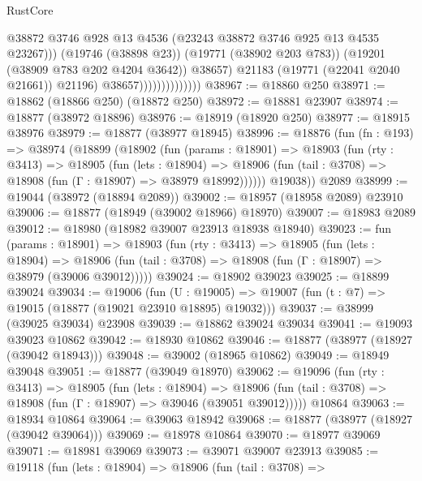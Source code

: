 \begin{lexlean}{RustCore}
\begin{coremodule}
                                        @38872
                                        @3746
                                        @928
                                        @13
                                        @4536
                                        (@23243 @38872 @3746 @925 @13 @4535 @23267)))
                                    (@19746 (@38898 @23))
                                    (@19771 (@38902 @203 @783))
                                    (@19201 (@38909 @783 @202 @4204 @3642))
                                    @38657)
                                  @21183
                                  (@19771 (@22041 @2040 @21661))
                                  @21196)
                                @38657))))))))))))))
@38967 := @18860 @250
@38971 := @18862 (@18866 @250) (@18872 @250)
@38972 := @18881 @23907
@38974 := @18877 (@38972 @18896)
@38976 := @18919 (@18920 @250)
@38977 := @18915 @38976
@38979 := @18877 (@38977 @18945)
@38996 := @18876
    (fun (fn : @193) =>
    @38974
      (@18899
        (@18902
          (fun (params : @18901) =>
          @18903
            (fun (rty : @3413) =>
            @18905
              (fun (lets : @18904) =>
              @18906 (fun (tail : @3708) => @18908 (fun (Γ : @18907) => @38979 @18992))))))
        @19038))
    @2089
@38999 := @19044 (@38972 (@18894 @2089))
@39002 := @18957 (@18958 @2089) @23910
@39006 := @18877 (@18949 (@39002 @18966) @18970)
@39007 := @18983 @2089
@39012 := @18980 (@18982 @39007 @23913 @18938 @18940)
@39023 := fun (params : @18901) =>
  @18903
    (fun (rty : @3413) =>
    @18905
      (fun (lets : @18904) =>
      @18906 (fun (tail : @3708) => @18908 (fun (Γ : @18907) => @38979 (@39006 @39012)))))
@39024 := @18902 @39023
@39025 := @18899 @39024
@39034 := @19006
    (fun (U : @19005) => @19007 (fun (t : @7) => @19015 (@18877 (@19021 @23910 @18895) @19032)))
@39037 := @38999 (@39025 @39034) @23908
@39039 := @18862 @39024 @39034
@39041 := @19093 @39023 @10862
@39042 := @18930 @10862
@39046 := @18877 (@38977 (@18927 (@39042 @18943)))
@39048 := @39002 (@18965 @10862)
@39049 := @18949 @39048
@39051 := @18877 (@39049 @18970)
@39062 := @19096
    (fun (rty : @3413) =>
    @18905
      (fun (lets : @18904) =>
      @18906 (fun (tail : @3708) => @18908 (fun (Γ : @18907) => @39046 (@39051 @39012)))))
    @10864
@39063 := @18934 @10864
@39064 := @39063 @18942
@39068 := @18877 (@38977 (@18927 (@39042 @39064)))
@39069 := @18978 @10864
@39070 := @18977 @39069
@39071 := @18981 @39069
@39073 := @39071 @39007 @23913
@39085 := @19118
    (fun (lets : @18904) =>
    @18906
      (fun (tail : @3708) =>

\end{coremodule}
\end{lexlean}
